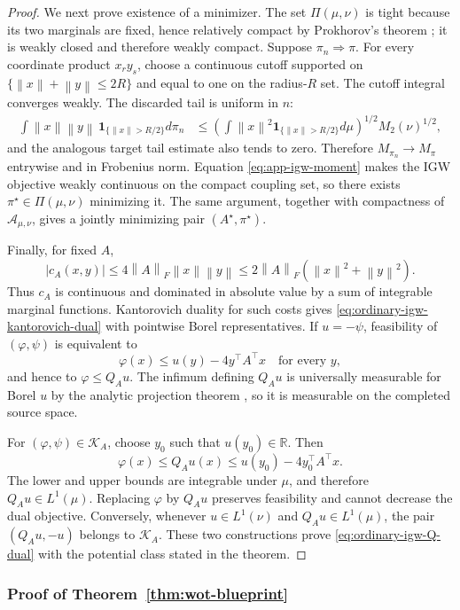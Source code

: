 \documentclass[11pt]{article}
\newcommand{\R}{\mathbb R}
\newcommand{\norm}[1]{\left\lVert #1\right\rVert}
\theoremstyle{plain}
\theoremstyle{definition}
\theoremstyle{remark}
\begin{document}
\begin{proof}
We next prove existence of a minimizer.  The set $\Pi(\mu,\nu)$ is tight because its two
marginals are fixed, hence relatively compact by Prokhorov's theorem
\cite[Theorem~5.1]{Billingsley}; it is weakly closed and therefore weakly compact.
Suppose
$\pi_n\Rightarrow\pi$.  For every coordinate product $x_ry_s$, choose a continuous
cutoff supported on $\{\norm x+\norm y\le2R\}$ and equal to one on the radius-$R$
set.  The cutoff integral converges weakly.  The discarded tail is uniform in $n$:
\begin{align*}
 \int\norm x\norm y\,\mathbf 1_{\{\norm x>R/2\}}d\pi_n
 &\le
 \left(\int\norm x^2\mathbf 1_{\{\norm x>R/2\}}d\mu\right)^{1/2}
 M_2(\nu)^{1/2},
\end{align*}
and the analogous target tail estimate also tends to zero.  Therefore
$M_{\pi_n}\to M_\pi$ entrywise and in Frobenius norm.  Equation
\eqref{eq:app-igw-moment} makes the IGW objective weakly continuous on the compact
coupling set, so there exists $\pi^\star\in\Pi(\mu,\nu)$ minimizing it.  The same
argument, together with compactness of $\mathcal A_{\mu,\nu}$, gives a jointly
minimizing pair $(A^\star,\pi^\star)$.

Finally, for fixed $A$,
\[
 |c_A(x,y)|\le4\norm A_F\norm x\norm y
 \le2\norm A_F(\norm x^2+\norm y^2).
\]
Thus $c_A$ is continuous and dominated in absolute value by a sum of integrable
marginal functions.  Kantorovich duality for such costs
\cite[Theorem~5.10]{VillaniOT} gives
\eqref{eq:ordinary-igw-kantorovich-dual} with pointwise Borel representatives.
If $u=-\psi$, feasibility of $(\varphi,\psi)$ is equivalent to
\[
 \varphi(x)\le u(y)-4y^\top A^\top x\quad\text{for every }y,
\]
and hence to $\varphi\le Q_Au$.  The infimum defining $Q_Au$ is universally
measurable for Borel $u$ by the analytic projection theorem
\cite[Proposition~7.47]{BertsekasShreve}, so it is measurable on the completed
source space.

For $(\varphi,\psi)\in\mathcal K_A$, choose $y_0$ such that $u(y_0)\in\R$.  Then
\[
 \varphi(x)\le Q_Au(x)\le u(y_0)-4y_0^\top A^\top x.
\]
The lower and upper bounds are integrable under $\mu$, and therefore
$Q_Au\in L^1(\mu)$.  Replacing $\varphi$ by $Q_Au$ preserves feasibility and cannot
decrease the dual objective.  Conversely, whenever $u\in L^1(\nu)$ and
$Q_Au\in L^1(\mu)$, the pair $(Q_Au,-u)$ belongs to $\mathcal K_A$.  These two
constructions prove \eqref{eq:ordinary-igw-Q-dual} with the potential class stated in
the theorem.
\end{proof}

\subsubsection{Proof of Theorem~\ref{thm:wot-blueprint}}\label{proof:2.4}
\end{document}
